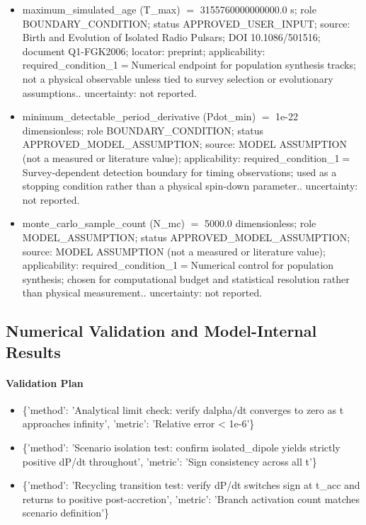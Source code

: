 \documentclass[11pt]{article}
\begin{document}
\begin{itemize}
\item maximum\_\allowbreak{}simulated\_\allowbreak{}age (T\_\allowbreak{}max) \ensuremath{=} 3155760000000000.0 s; role BOUNDARY\_\allowbreak{}CONDITION; status APPROVED\_\allowbreak{}USER\_\allowbreak{}INPUT; source: Birth and Evolution of Isolated Radio Pulsars; DOI 10.1086/\allowbreak{}501516; document Q1-FGK2006; locator: preprint; applicability: required\_\allowbreak{}condition\_\allowbreak{}1\ensuremath{=}Numerical endpoint for population synthesis tracks; not a physical observable unless tied to survey selection or evolutionary assumptions.. uncertainty: not reported.
\item minimum\_\allowbreak{}detectable\_\allowbreak{}period\_\allowbreak{}derivative (Pdot\_\allowbreak{}min) \ensuremath{=} 1e-22 dimensionless; role BOUNDARY\_\allowbreak{}CONDITION; status APPROVED\_\allowbreak{}MODEL\_\allowbreak{}ASSUMPTION; source: MODEL ASSUMPTION (not a measured or literature value); applicability: required\_\allowbreak{}condition\_\allowbreak{}1\ensuremath{=}Survey-dependent detection boundary for timing observations; used as a stopping condition rather than a physical spin-down parameter.. uncertainty: not reported.
\item monte\_\allowbreak{}carlo\_\allowbreak{}sample\_\allowbreak{}count (N\_\allowbreak{}mc) \ensuremath{=} 5000.0 dimensionless; role MODEL\_\allowbreak{}ASSUMPTION; status APPROVED\_\allowbreak{}MODEL\_\allowbreak{}ASSUMPTION; source: MODEL ASSUMPTION (not a measured or literature value); applicability: required\_\allowbreak{}condition\_\allowbreak{}1\ensuremath{=}Numerical control for population synthesis; chosen for computational budget and statistical resolution rather than physical measurement.. uncertainty: not reported.
\end{itemize}

\subsection{Numerical Validation and Model-Internal Results}

\paragraph{Validation Plan}
\begin{itemize}\raggedright
\item \{'method': 'Analytical limit check: verify dalpha/\allowbreak{}dt converges to zero as t approaches infinity', 'metric': 'Relative error < 1e-6'\}
\item \{'method': 'Scenario isolation test: confirm isolated\_\allowbreak{}dipole yields strictly positive dP/\allowbreak{}dt throughout', 'metric': 'Sign consistency across all t'\}
\item \{'method': 'Recycling transition test: verify dP/\allowbreak{}dt switches sign at t\_\allowbreak{}acc and returns to positive post-accretion', 'metric': 'Branch activation count matches scenario definition'\}
\end{itemize}
\end{document}
